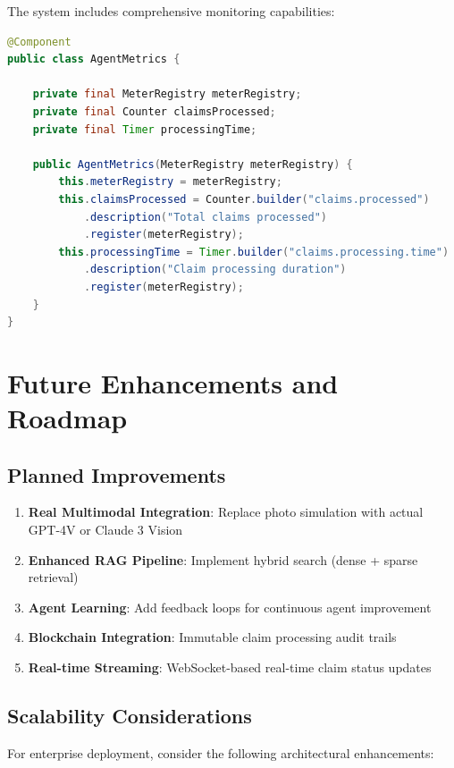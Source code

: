 \documentclass[12pt,a4paper]{article}
\begin{document}
The system includes comprehensive monitoring capabilities:

\begin{lstlisting}[language=java, caption=Monitoring Integration]
@Component
public class AgentMetrics {
    
    private final MeterRegistry meterRegistry;
    private final Counter claimsProcessed;
    private final Timer processingTime;
    
    public AgentMetrics(MeterRegistry meterRegistry) {
        this.meterRegistry = meterRegistry;
        this.claimsProcessed = Counter.builder("claims.processed")
            .description("Total claims processed")
            .register(meterRegistry);
        this.processingTime = Timer.builder("claims.processing.time")
            .description("Claim processing duration")
            .register(meterRegistry);
    }
}
\end{lstlisting}

\section{Future Enhancements and Roadmap}

\subsection{Planned Improvements}

\begin{enumerate}
    \item \textbf{Real Multimodal Integration}: Replace photo simulation with actual GPT-4V or Claude 3 Vision
    \item \textbf{Enhanced RAG Pipeline}: Implement hybrid search (dense + sparse retrieval)
    \item \textbf{Agent Learning}: Add feedback loops for continuous agent improvement
    \item \textbf{Blockchain Integration}: Immutable claim processing audit trails
    \item \textbf{Real-time Streaming}: WebSocket-based real-time claim status updates
\end{enumerate}

\subsection{Scalability Considerations}

For enterprise deployment, consider the following architectural enhancements:
\end{document}
